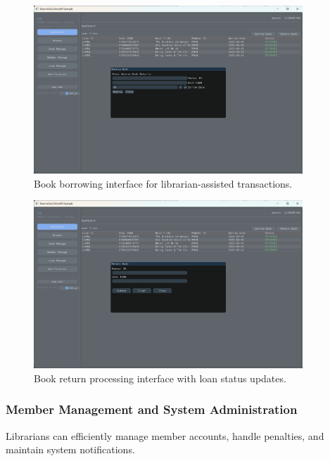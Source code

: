 \begin{figure}[H]
	\centering
	\includegraphics[width=0.9\textwidth]{figures/screenshot_librarian_borrow.png}
	\caption{Book borrowing interface for librarian-assisted transactions.}
	\label{fig:ss_librarian_borrow}
\end{figure}

\begin{figure}[H]
	\centering
	\includegraphics[width=0.9\textwidth]{figures/screenshot_librarian_return.png}
	\caption{Book return processing interface with loan status updates.}
	\label{fig:ss_librarian_return}
\end{figure}

\subsubsection{Member Management and System Administration}
Librarians can efficiently manage member accounts, handle penalties, and maintain system notifications.

